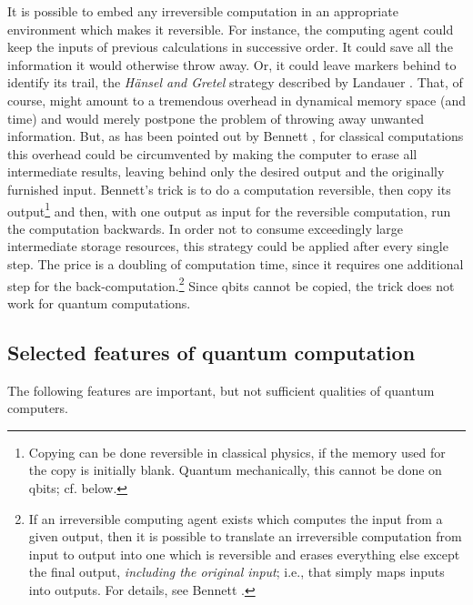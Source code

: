 It is possible to embed any irreversible computation in an appropriate
environment which makes it reversible. For instance, the computing agent
could keep the inputs of previous calculations in successive order.
It could save all the information it would otherwise throw away.
 Or,
it could leave markers behind to identify its trail, the {\it H\"ansel
and Gretel} strategy described by Landauer \cite{landauer-94}. That, of
course, might amount to a tremendous overhead in dynamical memory space
(and time) and would merely postpone the problem of throwing away
unwanted information. But, as has been pointed out by Bennett
\cite{bennett-73}, for classical computations this overhead could be
circumvented by making
the computer to erase all intermediate results, leaving behind only the
desired output and the originally furnished input. Bennett's trick is to
do a computation reversible, then copy its output\footnote{
Copying can be done
reversible in classical physics, if the memory used for the copy is
initially blank. Quantum mechanically, this cannot be done on qbits;
cf. below.}
and then, with one output as input for the reversible computation, run
the computation backwards. In order not to consume exceedingly large
intermediate storage resources, this strategy could be applied after
every single step. The price is a doubling of computation time, since it
requires one additional step for the back-computation.\footnote{
If an irreversible computing agent exists which computes the input from
a given output, then it is possible to translate an irreversible
computation from input to output into one which is reversible and erases
everything else except the final output, {\em including the
original input}; i.e., that simply maps inputs into outputs. For
details, see Bennett \cite{bennett-73,bennett-82}.}
Since qbits cannot be copied, the trick does not work for quantum
computations.



\subsection{Selected features of quantum computation}

The following features are important, but not sufficient qualities of
quantum computers.

